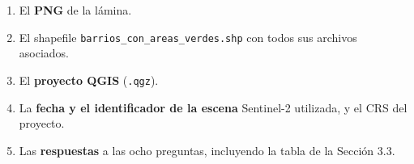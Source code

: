 \documentclass{article}
\begin{document}
\begin{enumerate}
    \item El \textbf{PNG} de la lámina.
    \item El shapefile \texttt{barrios\_con\_areas\_verdes.shp} con todos sus archivos asociados.
    \item El \textbf{proyecto QGIS} (\texttt{.qgz}).
    \item La \textbf{fecha y el identificador de la escena} Sentinel-2 utilizada, y el CRS del proyecto.
    \item Las \textbf{respuestas} a las ocho preguntas, incluyendo la tabla de la Sección 3.3.
\end{enumerate}
\end{document}
